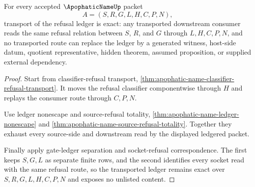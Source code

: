 \begin{theorem}
\label{thm:apophatic-name-ledger-refusal-transport-exactness}
For every accepted $\ApophaticNameUp$ packet
$$
A=(S,R,G,L,H,C,P,N),
$$
transport of the refusal ledger is exact: any transported downstream consumer reads the same refusal relation between $S$, $R$, and $G$ through $L,H,C,P,N$, and no transported route can replace the ledger by a generated witness, host-side datum, quotient representative, hidden theorem, assumed proposition, or supplied external dependency.
\end{theorem}
\begin{proof}
Start from classifier-refusal transport, \autoref{thm:apophatic-name-classifier-refusal-transport}. It moves the refusal classifier componentwise through $H$ and replays the consumer route through $C,P,N$.

Use ledger nonescape and source-refusal totality, \autoref{thm:apophatic-name-ledger-nonescape} and \autoref{thm:apophatic-name-source-refusal-totality}. Together they exhaust every source-side and downstream read by the displayed ledgered packet.

Finally apply gate-ledger separation and socket-refusal correspondence. The first keeps $S,G,L$ as separate finite rows, and the second identifies every socket read with the same refusal route, so the transported ledger remains exact over $S,R,G,L,H,C,P,N$ and exposes no unlisted content.
\end{proof}

